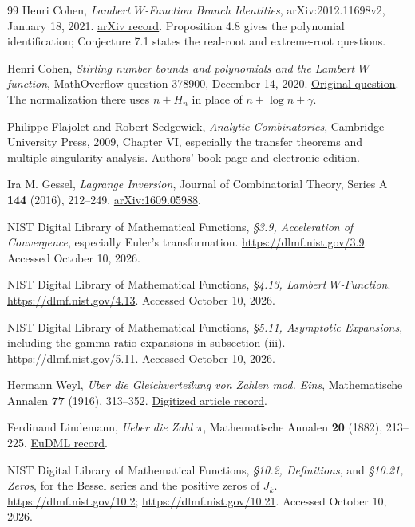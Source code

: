 \begin{thebibliography}{99}
Henri Cohen, \emph{Lambert $W$-Function Branch Identities},
arXiv:2012.11698v2, January 18, 2021.
\href{https://arxiv.org/abs/2012.11698}{arXiv record}.
Proposition 4.8 gives the polynomial identification;
Conjecture 7.1 states the real-root and extreme-root questions.

Henri Cohen,
\emph{Stirling number bounds and polynomials and the Lambert $W$ function},
MathOverflow question 378900, December 14, 2020.
\href{https://mathoverflow.net/questions/378900/stirling-number-bounds-and-polynomials-and-the-lambert-w-function}{Original question}.
The normalization there uses $n+H_n$ in place of $n+\log n+\gamma$.

Philippe Flajolet and Robert Sedgewick,
\emph{Analytic Combinatorics}, Cambridge University Press, 2009,
Chapter VI, especially the transfer theorems and multiple-singularity
analysis.
\href{https://algo.inria.fr/flajolet/Publications/AnaCombi/anacombi.html}{Authors' book page and electronic edition}.

Ira M. Gessel, \emph{Lagrange Inversion},
Journal of Combinatorial Theory, Series A \textbf{144} (2016), 212--249.
\href{https://arxiv.org/abs/1609.05988}{arXiv:1609.05988}.

NIST Digital Library of Mathematical Functions,
\emph{\S3.9, Acceleration of Convergence}, especially Euler's
transformation.
\url{https://dlmf.nist.gov/3.9}.
Accessed October 10, 2026.

NIST Digital Library of Mathematical Functions,
\emph{\S4.13, Lambert $W$-Function}.
\url{https://dlmf.nist.gov/4.13}.
Accessed October 10, 2026.

NIST Digital Library of Mathematical Functions,
\emph{\S5.11, Asymptotic Expansions}, including the gamma-ratio
expansions in subsection (iii).
\url{https://dlmf.nist.gov/5.11}.
Accessed October 10, 2026.

Hermann Weyl, \emph{\"Uber die Gleichverteilung von Zahlen mod. Eins},
Mathematische Annalen \textbf{77} (1916), 313--352.
\href{https://zenodo.org/records/2425535}{Digitized article record}.

Ferdinand Lindemann, \emph{Ueber die Zahl $\pi$},
Mathematische Annalen \textbf{20} (1882), 213--225.
\href{https://eudml.org/doc/157031}{EuDML record}.

NIST Digital Library of Mathematical Functions,
\emph{\S10.2, Definitions}, and \emph{\S10.21, Zeros},
for the Bessel series and the positive zeros of $J_k$.
\url{https://dlmf.nist.gov/10.2};
\url{https://dlmf.nist.gov/10.21}.
Accessed October 10, 2026.


\end{thebibliography}
